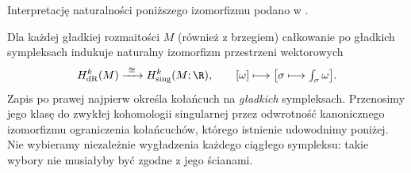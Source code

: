 Interpretację naturalności poniższego izomorfizmu podano w .

\begin{twierdzenie}[de Rham]
\label{thm:de-rham}
Dla każdej gładkiej rozmaitości $M$ (również z brzegiem)
całkowanie po gładkich sympleksach indukuje naturalny
izomorfizm przestrzeni wektorowych
\begin{equation}\label{eq:de-rham-iso}
 H^k_{\mathrm{dR}}(M)\xrightarrow{\ \cong\ }
 H^k_{\mathrm{sing}}(M;\R),
 \qquad [\omega]\longmapsto
 \bigl[\sigma\longmapsto\textstyle\int_\sigma\omega\bigr].
\end{equation}
Zapis po prawej najpierw określa kołańcuch na
\emph{gładkich} sympleksach. Przenosimy jego klasę do
zwykłej kohomologii singularnej przez odwrotność
kanonicznego izomorfizmu ograniczenia kołańcuchów,
którego istnienie udowodnimy poniżej. Nie wybieramy
niezależnie wygładzenia każdego ciągłego sympleksu:
takie wybory nie musiałyby być zgodne z jego ścianami.
\end{twierdzenie}
